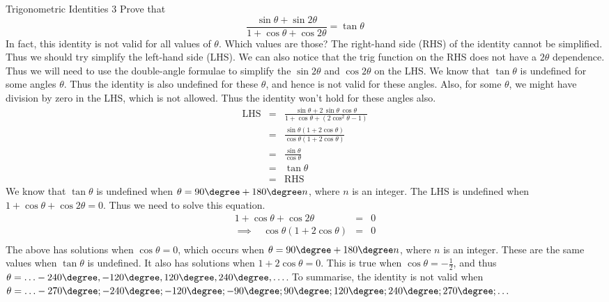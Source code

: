 \begin{wex}{Trigonometric Identities 3}
{Prove that $$\frac{\sin \theta+\sin  2\theta}{1+\cos\theta+\cos 2\theta}=\tan \theta$$
In fact, this identity is not valid for all values of $\theta$. Which values are those?}
{
The right-hand side (RHS) of the identity cannot be simplified. Thus we should try simplify the left-hand side (LHS). We can also notice that the trig function on the RHS does not have a $2\theta$ dependence. Thus we will need to use the double-angle formulae to simplify the $\sin 2\theta$ and $\cos 2\theta$ on the LHS. 
We know that $\tan\theta$ is undefined for some angles $\theta$. Thus the identity is also undefined for these $\theta$, and hence is not valid for these angles. Also, for some $\theta$, we might have division by zero in the LHS, which is not allowed. Thus the identity won't hold for these angles also.
\begin{eqnarray*}
\mbox{LHS}&=&\frac{\sin\theta+2\,\sin \theta\,\cos \theta}{1+\cos\theta +(2 \cos^2\theta-1)}\\
&=&\frac{\sin\theta(1+2 \cos\theta)}{\cos\theta(1+2\cos\theta)}\\
&=&\frac{\sin\theta}{\cos\theta}\\
&=&\tan\theta\\
&=&\mbox{RHS}
\end{eqnarray*}
We know that $\tan\theta$ is undefined when $\theta=90\degree+180\degree n$, where $n$ is an integer. 
The LHS is undefined when $1+\cos\theta+\cos 2\theta=0$. Thus we need to solve this equation.
\begin{eqnarray*}
1+\cos \theta+\cos 2\theta&=&0\\
\implies \ \ \ \ \cos \theta (1+2\cos\theta)&=&0\\
\end{eqnarray*}
The above has solutions when $\cos\theta=0$, which occurs when $\theta=90\degree+180\degree n$, where $n$ is an integer. These are the same values when $\tan\theta$ is undefined. It also has solutions when $1+2\cos\theta=0$. This is true when $\cos\theta=-\frac{1}{2}$, and thus $\theta=\ldots -240\degree, -120\degree, 120\degree, 240\degree, \ldots$. 
To summarise, the identity is not valid when $\theta=\ldots -270\degree; -240\degree; -120\degree; -90\degree;90\degree; 120\degree; 240\degree; 270\degree; \ldots$
}
\end{wex}

